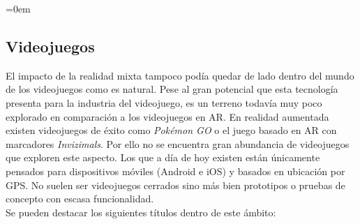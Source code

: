 \parindent=0em
\subsection{Videojuegos}
\noindent

El impacto de la realidad mixta tampoco podía quedar de lado dentro del mundo de los videojuegos como es natural. Pese al gran potencial que esta tecnología presenta para la industria del videojuego, es un terreno todavía muy poco explorado en comparación a los videojuegos en AR. En realidad aumentada existen videojuegos de éxito como \textit{Pokémon GO} o el juego basado en AR con marcadores \textit{Invizimals}. Por ello no se encuentra gran abundancia de videojuegos que exploren este aspecto. Los que a día de hoy existen están únicamente pensados para dispositivos móviles (Android e iOS) y basados en ubicación por GPS. No suelen ser videojuegos cerrados sino más bien prototipos o pruebas de concepto con escasa funcionalidad. \\

Se pueden destacar los siguientes títulos dentro de este ámbito:

